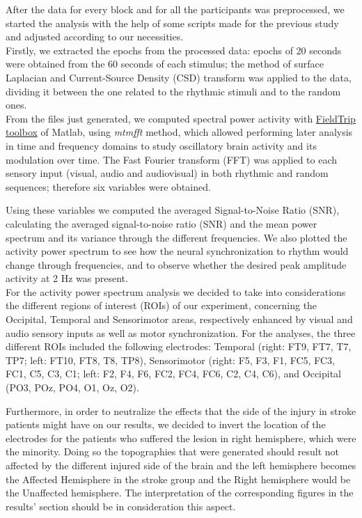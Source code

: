 After the data for every block and for all the participants was preprocessed, we started the analysis with the help of some scripts made for the previous study and adjusted according to our necessities. \\
Firstly, we extracted the epochs from the processed data: epochs of 20 seconds were obtained from the 60 seconds of each stimulus; the method of surface Laplacian and Current-Source Density (CSD) transform was applied to the data, dividing it between the one related to the rhythmic stimuli and to the random ones. \\
From the files just generated, we computed spectral power activity with \href{https://www.fieldtriptoolbox.org/}{FieldTrip toolbox} of Matlab, using \textit{mtmfft} method, which allowed performing later analysis in time and frequency domains to study oscillatory brain activity and its modulation over time. The Fast Fourier transform (FFT) was applied to each sensory input (visual, audio and audiovisual) in both rhythmic and random sequences; therefore six variables were obtained. 

Using these variables we computed the averaged Signal-to-Noise Ratio (SNR), calculating the averaged signal-to-noise ratio (SNR) and the mean power spectrum and its variance through the different frequencies. We also plotted the activity power spectrum to see how the neural synchronization to rhythm would change through frequencies, and to observe whether the desired peak amplitude activity at 2 Hz was present. \\
For the activity power spectrum analysis we decided to take into considerations the different regions of interest (ROIs) of our experiment, concerning the Occipital, Temporal and Sensorimotor areas, respectively enhanced by visual and audio sensory inputs as well as motor synchronization. For the analyses, the three different ROIs included the following electrodes: Temporal (right: FT9, FT7, T7, TP7; left: FT10, FT8, T8, TP8), Sensorimotor (right: F5, F3, F1, FC5, FC3, FC1, C5, C3, C1; left: F2, F4, F6, FC2, FC4, FC6, C2, C4, C6), and Occipital (PO3, POz, PO4, O1, Oz, O2). 

Furthermore, in order to neutralize the effects that the side of the injury in stroke patients might have on our results, we decided to invert the location of the electrodes for the patients who suffered the lesion in right hemisphere, which were the minority. Doing so the topographies that were generated should result not affected by the different injured side of the brain and the left hemisphere becomes the Affected Hemisphere in the stroke group and the Right hemisphere would be the Unaffected hemisphere. The interpretation of the corresponding figures in the results' section should be in consideration this aspect.  

